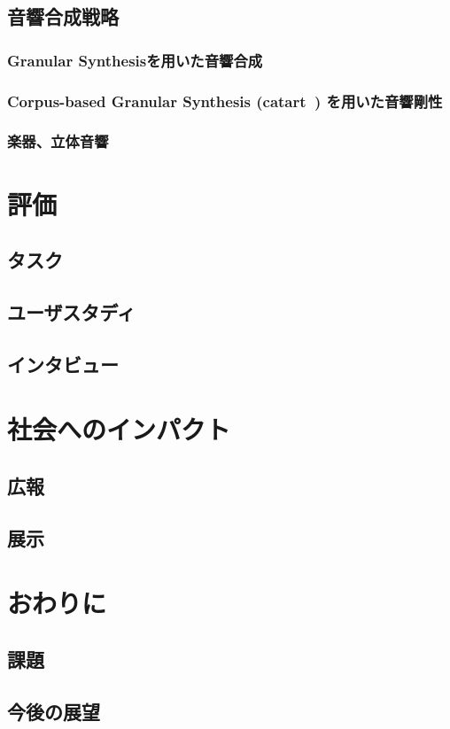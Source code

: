 \documentclass{jsarticle}
\begin{document}
\subsection{音響合成戦略}
\subsubsection{Granular Synthesisを用いた音響合成}
\subsubsection{Corpus-based Granular Synthesis (catart~) を用いた音響剛性}
\subsubsection{楽器、立体音響}

\section{評価}
\subsection{タスク}
\subsection{ユーザスタディ}
\subsection{インタビュー}

\section{社会へのインパクト}
\subsection{広報}
\subsection{展示}
\section{おわりに}
\subsection{課題}
\subsection{今後の展望}
\end{document}
